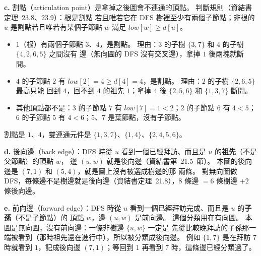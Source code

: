 \begin{pastsoln}
\textbf{c.} 割點（articulation point）是拿掉之後圖會不連通的頂點。 判斷規則（資結書定理~23.8、23.9）：根是割點
若且唯若它在 DFS 樹裡至少有兩個子節點；非根的 $u$ 是割點若且唯若有某個子節點 $w$ 滿足
$\mathit{low}[w] \ge d[u]$。
\begin{itemize}
\item $1$（根）有兩個子節點 $3$、$4$，是割點。 理由：$3$ 的子樹 $\{3, 7\}$ 和 $4$ 的子樹 $\{4, 2, 6, 5\}$ 之間沒有
邊（無向圖的 DFS 沒有交叉邊），拿掉 $1$ 後兩塊就斷開。
\item $4$ 的子節點 $2$ 有 $\mathit{low}[2] = 4 \ge d[4] = 4$，是割點。 理由：$2$ 的子樹 $\{2, 6, 5\}$ 最高只能
回到 $4$，回不到 $4$ 的祖先 $1$；拿掉 $4$ 後 $\{2, 5, 6\}$ 和 $\{1, 3, 7\}$ 斷開。
\item 其他頂點都不是：$3$ 的子節點 $7$ 有 $\mathit{low}[7] = 1 < 2$；$2$ 的子節點 $6$ 有 $4 < 5$；$6$ 的子節點 $5$ 有
$4 < 6$；$5$、$7$ 是葉節點，沒有子節點。
\end{itemize}
割點是 $1$、$4$，雙連通元件是 $\{1, 3, 7\}$、$\{1, 4\}$、$\{2, 4, 5, 6\}$。

\textbf{d.} 後向邊（back edge）：DFS 時從 $u$ 看到一個已經拜訪、而且是 $u$ 的\textbf{祖先}（不是父節點）的頂點 $w$，
邊 $(u, w)$ 就是後向邊（資結書第~21.5~節）。 本圖的後向邊是 $(7, 1)$ 和 $(5, 4)$，就是圖上沒有被選成樹邊的那
兩條。 對無向圖做 DFS，每條邊不是樹邊就是後向邊（資結書定理~21.8），$8$ 條邊 $= 6$ 條樹邊 $+ 2$ 條後向邊。

\textbf{e.} 前向邊（forward edge）：DFS 時從 $u$ 看到一個已經拜訪完成、而且是 $u$ 的\textbf{子孫}（不是子節點）的
頂點 $w$，邊 $(u, w)$ 是前向邊。 這個分類用在有向圖。 本圖是無向圖，沒有前向邊：一條非樹邊 $\{u, w\}$ 一定是
先從比較晚拜訪的子孫那一端被看到（那時祖先還在進行中），所以被分類成後向邊。 例如 $\{1, 7\}$ 是在拜訪
$7$ 時就看到 $1$，記成後向邊 $(7, 1)$；等回到 $1$ 再看到 $7$ 時，這條邊已經分類過了。
\end{pastsoln}
